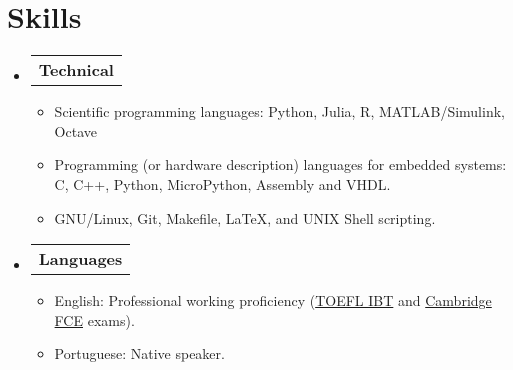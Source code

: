 \section{Skills}

\begin{itemize}[leftmargin=0.15in, label={}] %
  \item   \begin{tabular*}{0.2\textwidth}{l} \textbf{Technical} \end{tabular*}\vspace{-7pt} %
          \begin{itemize} %
            \item Scientific programming languages: Python, Julia, R, MATLAB/Simulink, Octave
            \item Programming (or hardware description) languages for embedded systems: C, C++, Python, MicroPython, Assembly and VHDL. %
            \item GNU/Linux, Git, Makefile, \LaTeX, and UNIX Shell scripting.
          \end{itemize}\vspace{-5pt}
  \item   \begin{tabular*}{0.2\textwidth}{l} \textbf{Languages} \end{tabular*}\vspace{-6pt} %
          \begin{itemize}
            \item English: Professional working proficiency (\href{https://github.com/tapyu/tapyu/blob/master/cv/Latex/figs/Toefl.pdf}{TOEFL IBT} and \href{https://github.com/tapyu/tapyu/blob/master/cv/Latex/figs/Cambridge\%20FCE.pdf}{Cambridge FCE} exams).
            \item Portuguese: Native speaker.
          \end{itemize}
\end{itemize} %
